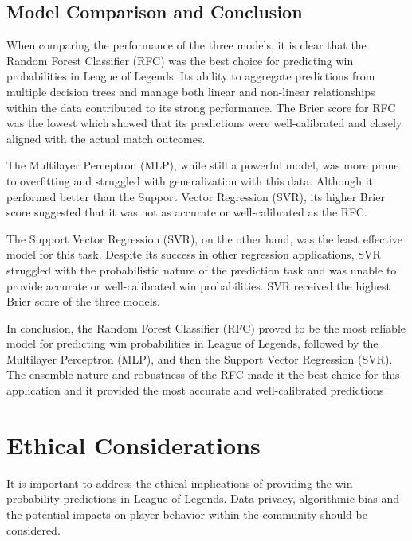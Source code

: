 \documentclass[10pt,twocolumn]{article}
\begin{document}
\subsection{Model Comparison and Conclusion}
When comparing the performance of the three models, it is clear that the Random Forest Classifier (RFC) was the best choice for predicting win probabilities in League of Legends. Its ability to aggregate predictions from multiple decision trees and manage both linear and non-linear relationships within the data contributed to its strong performance. The Brier score for RFC was the lowest which showed that its predictions were well-calibrated and closely aligned with the actual match outcomes.

The Multilayer Perceptron (MLP), while still a powerful model, was more prone to overfitting and struggled with generalization with this data. Although it performed better than the Support Vector Regression (SVR), its higher Brier score suggested that it was not as accurate or well-calibrated as the RFC.

The Support Vector Regression (SVR), on the other hand, was the least effective model for this task. Despite its success in other regression applications, SVR struggled with the probabilistic nature of the prediction task and was unable to provide accurate or well-calibrated win probabilities. SVR received the highest Brier score of the three models.

In conclusion, the Random Forest Classifier (RFC) proved to be the most reliable model for predicting win probabilities in League of Legends, followed by the Multilayer Perceptron (MLP), and then the Support Vector Regression (SVR). The ensemble nature and robustness of the RFC made it the best choice for this application and it provided the most accurate and well-calibrated predictions

\section{Ethical Considerations}

It is important to address the ethical implications of providing the win probability predictions in League of Legends.  Data privacy, algorithmic bias and the potential impacts on player behavior within the community should be considered.
\end{document}
